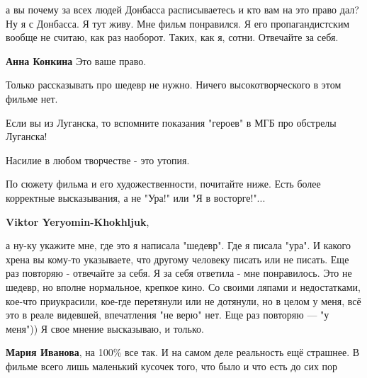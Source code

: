 \begin{itemize}
\begin{itemize}
а вы почему за всех людей Донбасса расписываетесь и кто вам на это право дал?
Ну я с Донбасса. Я тут живу. Мне фильм понравился. Я его пропагандистским
вообще не считаю, как раз наоборот. Таких, как я, сотни. Отвечайте за себя.

 
\textbf{Анна Конкина}
Это ваше право.

Только рассказывать про шедевр не нужно. Ничего высокотворческого в этом фильме
нет.

Если вы из Луганска, то вспомните показания "героев" в МГБ про обстрелы
Луганска!

Насилие в любом творчестве - это утопия.

По сюжету фильма и его художественности, почитайте ниже. Есть более корректные
высказывания, а не "Ура!" или "Я в восторге!"...


 
\textbf{Viktor Yeryomin-Khokhljuk}, 

а ну-ку укажите мне, где это я написала
"шедевр". Где я писала "ура". И какого хрена вы кому-то указываете, что другому
человеку писать или не писать. Еще раз повторяю - отвечайте за себя. Я за себя
ответила - мне понравилось. Это не шедевр, но вполне нормальное, крепкое кино.
Со своими ляпами и недостатками, кое-что приукрасили, кое-где перетянули или не
дотянули, но в целом у меня, всё это в реале видевшей, впечатления "не верю"
нет. Еще раз повторяю — "у меня")) Я свое мнение высказываю, и только.


\textbf{Мария Иванова}, на 100\% все так. И на самом деле реальность ещё
страшнее. В фильме всего лишь маленький кусочек того, что было и что есть до
сих пор

 

\end{itemize}
\end{itemize}

